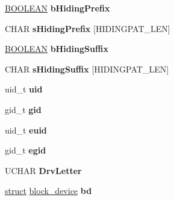 \begin{DoxyCompactItemize}
\begin{tabbing}
\end{tabbing}\item 
\mbox{\label{struct___e_x_t2___v_c_b_a3fda42d9fc26c35b39a6be04d8bdee12}} 
\hyperlink{_processor_bind_8h_a112e3146cb38b6ee95e64d85842e380a}{B\+O\+O\+L\+E\+AN} {\bfseries b\+Hiding\+Prefix}
\item 
\mbox{\label{struct___e_x_t2___v_c_b_a76d4e45a50f55b0587a150dbde8b8aff}} 
C\+H\+AR {\bfseries s\+Hiding\+Prefix} \mbox{[}H\+I\+D\+I\+N\+G\+P\+A\+T\+\_\+\+L\+EN\mbox{]}
\item 
\mbox{\label{struct___e_x_t2___v_c_b_a4448cc3b1c56245a424d416e58e78c32}} 
\hyperlink{_processor_bind_8h_a112e3146cb38b6ee95e64d85842e380a}{B\+O\+O\+L\+E\+AN} {\bfseries b\+Hiding\+Suffix}
\item 
\mbox{\label{struct___e_x_t2___v_c_b_a98744ea2ec5e46662dd0763d10880958}} 
C\+H\+AR {\bfseries s\+Hiding\+Suffix} \mbox{[}H\+I\+D\+I\+N\+G\+P\+A\+T\+\_\+\+L\+EN\mbox{]}
\item 
\mbox{\label{struct___e_x_t2___v_c_b_a6d2a4cc7747e953d20099e5c19390348}} 
uid\+\_\+t {\bfseries uid}
\item 
\mbox{\label{struct___e_x_t2___v_c_b_a031f3d686e94ac33e22446f71a8f3d95}} 
gid\+\_\+t {\bfseries gid}
\item 
\mbox{\label{struct___e_x_t2___v_c_b_acabc4abe4affa75cb59968aeb71d0259}} 
uid\+\_\+t {\bfseries euid}
\item 
\mbox{\label{struct___e_x_t2___v_c_b_a1627039021b5b00ac02697d9b75e77eb}} 
gid\+\_\+t {\bfseries egid}
\item 
\mbox{\label{struct___e_x_t2___v_c_b_a535e295168aa0491440de0fa0a30548b}} 
U\+C\+H\+AR {\bfseries Drv\+Letter}
\item 
\mbox{\label{struct___e_x_t2___v_c_b_a322fcdc1492246bd254e323775819e1b}} 
\hyperlink{interfacestruct}{struct} \hyperlink{structblock__device}{block\+\_\+device} {\bfseries bd}

\end{DoxyCompactItemize}

